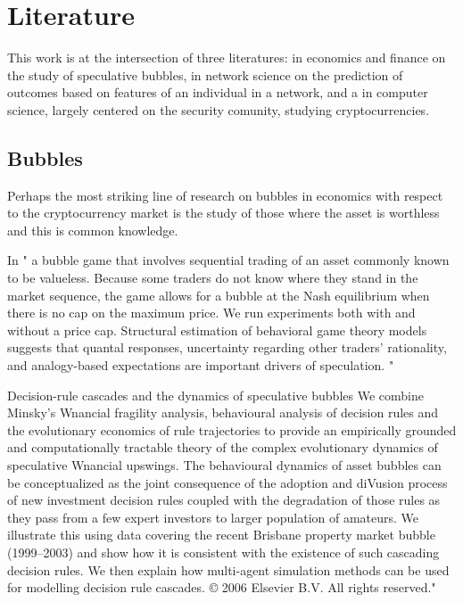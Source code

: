 \section{Literature}

This work is at the intersection of three literatures: in economics and finance on the study of speculative bubbles, in network science on the prediction of outcomes based on features of an individual in a network, and a in computer science, largely centered on the security comunity, studying cryptocurrencies.


\subsection{Bubbles}

Perhaps the most striking line of research on bubbles in economics with respect to the cryptocurrency market is the study of those where the asset is worthless and this is common knowledge. 

In \cite{moinas2013bubble} " a bubble game that involves sequential trading of an
asset commonly known to be valueless. Because some traders do not
know where they stand in the market sequence, the game allows for
a bubble at the Nash equilibrium when there is no cap on the maximum
price. We run experiments both with and without a price cap.
Structural estimation of behavioral game theory models suggests that
quantal responses, uncertainty regarding other traders’ rationality,
and analogy-based expectations are important drivers of speculation. "


Decision-rule cascades and the dynamics of speculative bubbles
We combine Minsky’s Wnancial fragility analysis, behavioural analysis of decision rules and the
evolutionary economics of rule trajectories to provide an empirically grounded and computationally
tractable theory of the complex evolutionary dynamics of speculative Wnancial upswings. The behavioural
dynamics of asset bubbles can be conceptualized as the joint consequence of the adoption and
diVusion process of new investment decision rules coupled with the degradation of those rules as they
pass from a few expert investors to larger population of amateurs. We illustrate this using data covering
the recent Brisbane property market bubble (1999–2003) and show how it is consistent with the
existence of such cascading decision rules. We then explain how multi-agent simulation methods can
be used for modelling decision rule cascades.
© 2006 Elsevier B.V. All rights reserved."

